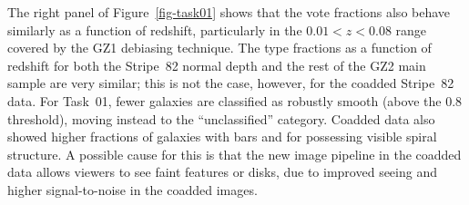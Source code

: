\documentclass[useAMS,usenatbib]{mn2e}
\begin{document}
The right panel of Figure~\ref{fig-task01} shows that the vote fractions also behave similarly as a function of redshift, particularly in the $0.01<z<0.08$ range covered by the GZ1 debiasing technique. The type fractions as a function of redshift for both the Stripe~82 normal depth and the rest of the GZ2 main sample are very similar; this is not the case, however, for the coadded Stripe~82 data. For Task~01, fewer galaxies are classified as robustly smooth (above the 0.8 threshold), moving instead to the ``unclassified'' category. Coadded data also showed higher fractions of galaxies with bars and for possessing visible spiral structure. A possible cause for this is that the new image pipeline in the coadded data allows viewers to see faint features or disks, due to improved seeing \citep[from $1.4\arcsec$ to $1.1\arcsec$;][]{ann11} and higher signal-to-noise in the coadded images.

\end{document}
